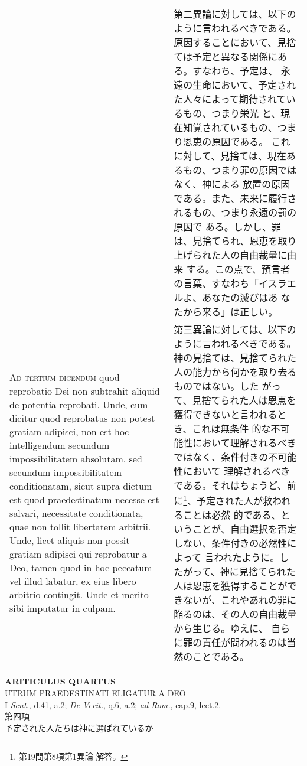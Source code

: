 \documentclass[10pt]{jsarticle} %
\begin{document}
\begin{longtable}{p{21em}p{21em}}
&

 第二異論に対しては、以下のように言われるべきである。
 原因することにおいて、見捨ては予定と異なる関係にある。すなわち、予定は、
永遠の生命において、予定された人々によって期待されているもの、つまり栄光
 と、現在知覚されているもの、つまり恩恵の原因である。
 これに対して、見捨ては、現在あるもの、つまり罪の原因ではなく、神による
 放置の原因である。また、未来に履行されるもの、つまり永遠の罰の原因で
 ある。しかし、罪は、見捨てられ、恩恵を取り上げられた人の自由裁量に由来
 する。この点で、預言者の言葉、すなわち「イスラエルよ、あなたの滅びはあ
 なたから来る」は正しい。

 
\\


{\scshape Ad tertium dicendum} quod reprobatio Dei non
subtrahit aliquid de potentia reprobati. Unde, cum dicitur quod
reprobatus non potest gratiam adipisci, non est hoc intelligendum
secundum impossibilitatem absolutam, sed secundum impossibilitatem
conditionatam, sicut supra dictum est quod praedestinatum necesse est
salvari, necessitate conditionata, quae non tollit libertatem
arbitrii. Unde, licet aliquis non possit gratiam adipisci qui reprobatur
a Deo, tamen quod in hoc peccatum vel illud labatur, ex eius libero
arbitrio contingit. Unde et merito sibi imputatur in culpam.


&

 第三異論に対しては、以下のように言われるべきである。
 神の見捨ては、見捨てられた人の能力から何かを取り去るものではない。した
 がって、見捨てられた人は恩恵を獲得できないと言われるとき、これは無条件
 的な不可能性において理解されるべきではなく、条件付きの不可能性において
 理解されるべきである。それはちょうど、前に\footnote{第19問第8項第1異論
 解答。}、予定された人が救われることは必然
 的である、ということが、自由選択を否定しない、条件付きの必然性によって
 言われたように。したがって、神に見捨てられた人は恩恵を獲得することがで
 きないが、これやあれの罪に陥るのは、その人の自由裁量から生じる。ゆえに、
 自らに罪の責任が問われるのは当然のことである。

 
\end{longtable}
\newpage





\begin{center}
 {\Large {\bf ARITICULUS QUARTUS}}\\
 {\large UTRUM PRAEDESTINATI ELIGATUR A DEO}\\
 {\footnotesize I {\itshape Sent.}, d.41, a.2; {\itshape De Verit.},
 q.6, a.2; {\itshape ad Rom.}, cap.9, lect.2.}\\
 {\Large 第四項\\予定された人たちは神に選ばれているか}
\end{center}
\end{document}
